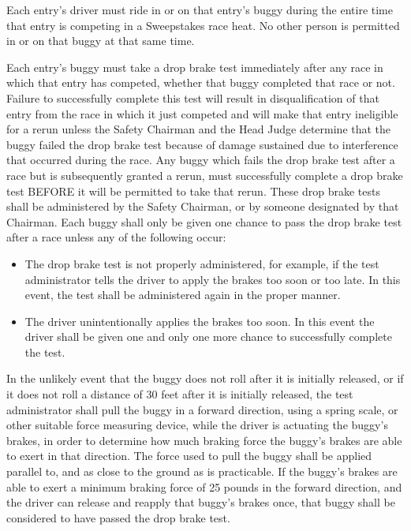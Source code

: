 	Each entry's driver must ride in or on that entry's buggy during the entire
	time that entry is competing in a Sweepstakes race heat. No other person is
	permitted in or on that buggy at that same time.

	Each entry's buggy must take a drop brake test immediately after any race in
	which that entry has competed, whether that buggy completed that race or not.
	Failure to successfully complete this test will result in disqualification of
	that entry from the race in which it just competed and will make that entry
	ineligible for a rerun unless the Safety Chairman and the Head Judge determine
	that the buggy failed the drop brake test because of damage sustained due to
	interference that occurred during the race. Any buggy which fails the drop
	brake test after a race but is subsequently granted a rerun, must successfully
	complete a drop brake test BEFORE it will be permitted to take that rerun.
	These drop brake tests shall be administered by the Safety Chairman, or by
	someone designated by that Chairman. Each buggy shall only be given one chance
	to pass the drop brake test after a race unless any of the following occur:

	\begin{itemize}
		
		\item
		The drop brake test is not properly administered, for example, if the test
		administrator tells the driver to apply the brakes too soon or too late. In
		this event, the test shall be administered again in the proper manner.

		\item
		The driver unintentionally applies the brakes too soon. In this event the
		driver shall be given one and only one more chance to successfully complete the
		test. 

	\end{itemize}

	In the unlikely event that the buggy does not roll after it is initially
	released, or if it does not roll a distance of 30 feet after it is initially
	released, the test administrator shall pull the buggy in a forward direction,
	using a spring scale, or other suitable force measuring device, while the
	driver is actuating the buggy's brakes, in order to determine how much braking
	force the buggy's brakes are able to exert in that direction. The force used to
	pull the buggy shall be applied parallel to, and as close to the ground as is
	practicable. If the buggy's brakes are able to exert a minimum braking force of
	25 pounds in the forward direction, and the driver can release and reapply that
	buggy's brakes once, that buggy shall be considered to have passed the drop
	brake test.

